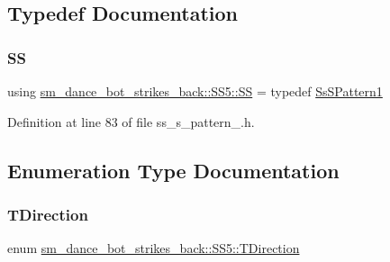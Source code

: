 \subsection{Typedef Documentation}
\mbox{\label{namespacesm__dance__bot__strikes__back_1_1SS5_a0b538a03cd46608c47302a6e1b6d7737}} 
\subsubsection{\texorpdfstring{SS}{SS}}
{\footnotesize\ttfamily using \hyperlink{namespacesm__dance__bot__strikes__back_1_1SS5_a0b538a03cd46608c47302a6e1b6d7737}{sm\+\_\+dance\+\_\+bot\+\_\+strikes\+\_\+back\+::\+S\+S5\+::\+SS} = typedef \hyperlink{structsm__dance__bot__strikes__back_1_1SS5_1_1SsSPattern1}{Ss\+S\+Pattern1}}



Definition at line 83 of file ss\+\_\+s\+\_\+pattern\+\_.\+h.



\subsection{Enumeration Type Documentation}
\mbox{\label{namespacesm__dance__bot__strikes__back_1_1SS5_a9bfe9437a81f94ff39bae6daa0cec2e6}} 
\subsubsection{\texorpdfstring{T\+Direction}{TDirection}}
{\footnotesize\ttfamily enum \hyperlink{namespacesm__dance__bot__strikes__back_1_1SS5_a9bfe9437a81f94ff39bae6daa0cec2e6}{sm\+\_\+dance\+\_\+bot\+\_\+strikes\+\_\+back\+::\+S\+S5\+::\+T\+Direction}\hspace{0.3cm}{\ttfamily [strong]}}

